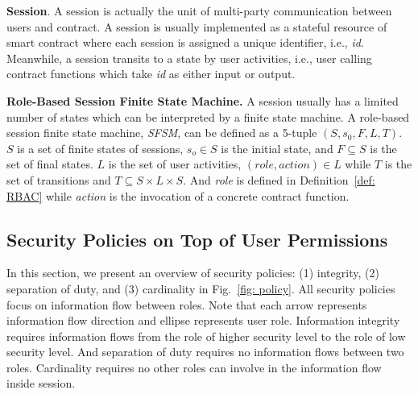 \begin{definition}
	\textbf{Session}.
	A session is actually the unit of multi-party communication between users and contract.
	A session is usually implemented as a stateful resource of smart contract where each session is assigned a unique identifier, i.e., \textit{id}. 
	Meanwhile, a session transits to a state by user activities, i.e., user calling contract functions which take \textit{id} as either input or output.
\end{definition}
\begin{definition}
	\textbf{Role-Based Session Finite State Machine.} 
	A session usually has a limited number of states which can be interpreted by a finite state machine.
	A role-based session finite state machine, \textit{SFSM}, can be defined as a 5-tuple $(S, s_0, F, L,T )$. $S$ is a set of finite states of sessions, $s_o \in S$	is the initial state, and $F \subseteq S$ is the set of final states. $L$ is the set of user activities, $(role, action)\in L$ while $T$ is the set of transitions and $T \subseteq S \times L \times S$.
	And \textit{role} is defined in Definition~\ref{def: RBAC} while \textit{action} is the invocation of a concrete contract function. 
\end{definition} 
%
\subsection{Security Policies on Top of User Permissions}
\label{subsec: policy}
In this section, we present an overview of security policies: (1) integrity, (2) separation of duty, and (3) cardinality in Fig.~\ref{fig: policy}. 
All security policies focus on information flow between roles.
Note that each arrow represents information flow direction and ellipse represents user role.
Information integrity requires information flows from the role of higher security level to the role of low security level.
And separation of duty requires no information flows between two roles.
Cardinality requires no other roles can involve in the information flow inside session.


